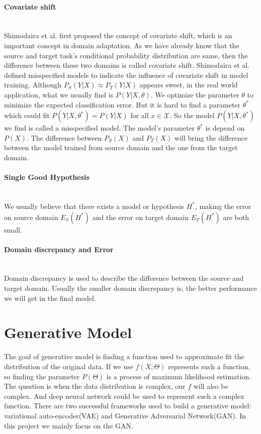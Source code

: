\documentclass{kththesis}
\begin{document}
\paragraph{Covariate shift}~{}\\
Shimodaira et al.\cite{shimodaira2000improving} first proposed the concept of covariate shift, which is an important concept in domain adaptation. As we have already know that the source and target task's conditional probability distribution are same, then the difference between these two domains is called covariate shift. Shimodaira et al.\cite{shimodaira2000improving} defined misspecified models to indicate the influence of covariate shift in model training. Although $P_S(Y|X) \approx P_T(Y|X)$ appears sweet, in the real world application, what we usually find is $P(Y|X,\theta)$. We optimize the parameter $\theta$ to minimize the expected classification error. But it is hard to find a parameter $\theta^*$ which could fit $P(Y|X,\theta^*) = P(Y|X)$ for all $x \in \mathcal{X}$. So the model $P(Y|X,\theta^*)$ we find is called a misspecified model. The model's parameter $\theta^*$ is depend on $P(X)$. The difference between $P_S(X)$ and $P_T(X)$ will bring the difference between the model trained from source domain and the one from the target domain. 

\paragraph{Single Good Hypothesis}~{}\\
We usually believe that there exists a model or hypothesis $H^*$, making the error on source domain $E_S(H^*)$ and the error on target domain $E_T(H^*)$ are both small. 

\paragraph{Domain discrepancy and Error}~{}\\
Domain discrepancy is used to describe the difference between the source and target domain. Usually the smaller domain discrepancy is, the better performance we will get in the final model. 


\section{Generative Model}
The goal of generative model is finding a function used to approximate fit the distribution of the original data. If we use $f(X;\Theta)$ represents such a function, so finding the parameter $P(\Theta)$ is a process of maximum likelihood estimation. The question is when the data distribution is complex, our $f$ will also be complex. And deep neural network could be used to represent such a complex function. There are two successful frameworks used to build a generative model: variational auto-encoder(VAE) and Generative Adversarial Network(GAN). In this project we mainly focus on the GAN. 
\end{document}
